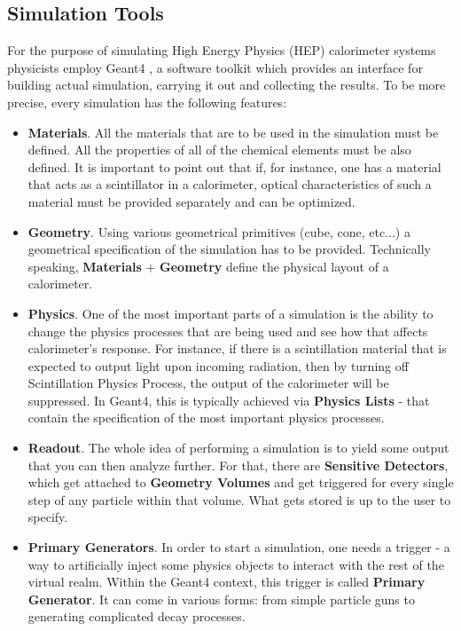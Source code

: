 \subsection{Simulation Tools} \label{subsection:simulations_introduction_geant4}
For the purpose of simulating High Energy Physics (HEP) calorimeter systems physicists employ {\sc Geant4} \cite{Geant4-1,Geant4-2}, a software toolkit which provides an interface for building actual simulation, carrying it out and collecting the results. To be more precise, every simulation has the following features:
\begin{itemize}
    \item \textbf{Materials}. All the materials that are to be used in the simulation must be defined. All the properties of all of the chemical elements must be also defined. It is important to point out that if, for instance, one has a material that acts as a scintillator in a calorimeter, optical characteristics of such a material must be provided separately and can be optimized.
    \item \textbf{Geometry}. Using various geometrical primitives (cube, cone, etc...) a geometrical specification of the simulation has to be provided. Technically speaking, \textbf{Materials} $+$ \textbf{Geometry} define the physical layout of a calorimeter.
    \item \textbf{Physics}. One of the most important parts of a simulation is the ability to change the physics processes that are being used and see how that affects calorimeter's response. For instance, if there is a scintillation material that is expected to output light upon incoming radiation, then by turning off Scintillation Physics Process, the output of the calorimeter will be suppressed. In {\sc Geant4}, this is typically achieved via \textbf{Physics Lists} - that contain the specification of the most important physics processes.
    \item \textbf{Readout}. The whole idea of performing a simulation is to yield some output that you can then analyze further. For that, there are \textbf{Sensitive Detectors}, which get attached to \textbf{Geometry Volumes} and get triggered for every single step of any particle within that volume. What gets stored is up to the user to specify.
    \item \textbf{Primary Generators}. In order to start a simulation, one needs a trigger - a way to artificially inject some physics objects to interact with the rest of the virtual realm. Within the {\sc Geant4} context, this trigger is called \textbf{Primary Generator}. It can come in various forms: from simple particle guns to generating complicated decay processes.

\end{itemize}
